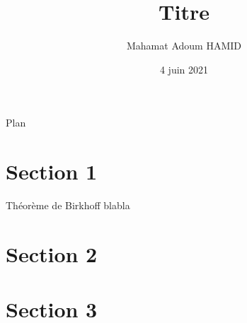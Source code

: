 \documentclass[aspectratio=169]{beamer}
\title{\textbf{Titre}}
\author{Mahamat Adoum HAMID}
\date{4 juin 2021}
\institute{IMS Networks}
\begin{document}
	\begin{frame}
		\titlepage
	\end{frame}
	
	\begin{frame}{Plan}
		\tableofcontents%
	\end{frame}
	
	
	\section{Section 1}
	\begin{block}{Théorème de Birkhoff}
		blabla
	\end{block}
	
	
	\section{Section 2}
	
	\section{Section 3}
	
	
\end{document}
